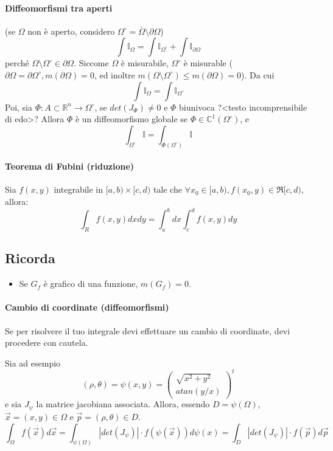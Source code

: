 \documentclass[a4paper,12pt]{book}
\begin{document}
\paragraph{Diffeomorfismi tra aperti}
(se $\Omega$ non è aperto, considero $\Omega^\circ = \bar{\Omega}\setminus\partial\Omega$)\\
$$\int \mathbb{I}_\Omega = \int \mathbb{I}_{\Omega^\circ} + \int \mathbb{I}_{\partial\Omega}$$
perché $\Omega\setminus\Omega^\circ \in \partial\Omega$. Siccome $\Omega$ è misurabile, $\Omega^\circ$ è misurable ($\partial\Omega = \partial\Omega^\circ, m(\partial\Omega) = 0$, ed inoltre $m(\Omega\setminus\Omega^\circ) \leq m(\partial\Omega) = 0$).
Da cui
$$\int \mathbb{I}_\Omega = \int \mathbb{I}_{\Omega^\circ} $$
Poi, sia $\Phi: A \subset \mathbb{R}^n \rightarrow \Omega^\circ$, se $det(J_\Phi) \neq 0$ e $\Phi$ biunivoca ?<testo incomprensibile di edo>? Allora $\Phi$ è un diffeomorfismo globale se $\Phi \in \mathbb{C}^1(\Omega^\circ)$, e
$$\int_{\Omega^\circ} \mathbb{I} = \int_{\Phi(\Omega^\circ)} \mathbb{I} $$

\paragraph{Teorema di Fubini (riduzione)}
Sia $f(x, y)$ integrabile in $[a, b)\times[c,d)$ tale che $\forall x_0 \in [a,b), f(x_0, y) \in \Re[c,d)$, allora:
$$\int_R f(x, y)dxdy = \int^b_a dx\int^d_c f(x, y) dy$$

\subsection{Ricorda}
\begin{itemize}
 \item Se $G_f$ è grafico di una funzione, $m(G_f) = 0$.
\end{itemize}
\paragraph{Cambio di coordinate (diffeomorfismi)}
Se per risolvere il tuo integrale devi effettuare un cambio di coordinate, devi procedere con cautela.

Sia ad esempio $$(\rho, \theta) = \psi(x, y) = \left(\begin{matrix}\sqrt{x^2+y^2} \\ atan(y/x)\end{matrix}\right)^t$$
e sia $J_\psi$ la matrice jacobiana associata.
Allora, essendo $D=\psi(\Omega)$,\\ $\vec{x} = (x, y) \in \Omega$ e $\vec{p} = (\rho, \theta) \in D$.
$$ \int_\Omega f(\vec{x}) d\vec{x} = \int_{\psi(\Omega)} |det(J_\psi)|\cdot f(\psi(\vec{x})) d\psi(x) = \int_D |det(J_\psi)|\cdot f(\vec{p})d\vec{p} $$
\end{document}
